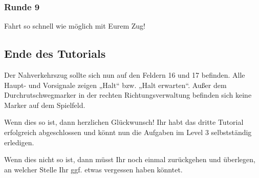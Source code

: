 \subsubsection*{Runde 9}
  Fahrt so schnell wie möglich mit Eurem Zug!


\subsection*{Ende des Tutorials}
  Der Nahverkehrszug sollte sich nun auf den Feldern 16 und 17 befinden. Alle  Haupt- und Vorsignale zeigen „Halt“ bzw. „Halt erwarten“. Außer dem Durchrutschwegmarker in der rechten Richtungsverwaltung befinden sich keine Marker auf dem Spielfeld.
  \begin{framed}\noindent
    Wenn dies so ist, dann herzlichen Glückwunsch! Ihr habt das dritte Tutorial erfolgreich abgeschlossen und könnt nun die Aufgaben im Level 3 selbstständig erledigen.
  \end{framed}
  \begin{framed}\noindent
    Wenn dies nicht so ist, dann müsst Ihr noch einmal zurückgehen und überlegen, an welcher Stelle Ihr ggf. etwas vergessen haben könntet.
  \end{framed}
